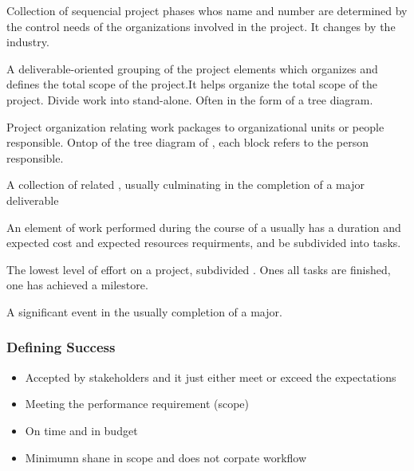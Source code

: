\documentclass[english, 11pt]{article}
\begin{document}
      \begin{defn}\label{plc}
        Collection of sequencial project phases whos name and number are determined by the control needs of the organizations involved in the project. It changes by the industry.
      \end{defn}

      \begin{defn}\label{wbs}
        A deliverable-oriented grouping of the project elements which organizes and defines the total scope of the project.It helps organize the total scope of the project. Divide work into stand-alone. Often in the form of a tree diagram.
      \end{defn}

      \begin{defn}\label{obs}
        Project organization relating work packages to organizational units or people responsible. Ontop of the tree diagram of , each block refers to the person responsible.
      \end{defn}

      \begin{defn}\label{project phase}
        A collection of related , usually culminating in the completion of a major deliverable
      \end{defn}

      \begin{defn}[Activity]\label{activity}
        An element of work performed during the course of a  usually has a duration and expected cost and expected resources requirments, and be subdivided into tasks.
      \end{defn}

      \begin{defn}[Task]\label{task}
        The lowest level of effort on a project, subdivided . Ones all tasks are finished, one has achieved a milestore.
      \end{defn}

      \begin{defn}[Milestone]\label{milestone}
        A significant event in the  usually completion of a major.
      \end{defn}

      \subsubsection{Defining Success}
      \begin{itemize}
        \item Accepted by stakeholders and it just either meet or exceed the expectations
        \item Meeting the performance requirement (scope)
        \item On time and in budget
        \item Minimumn shane in scope and does not corpate workflow
      \end{itemize}
\end{document}
